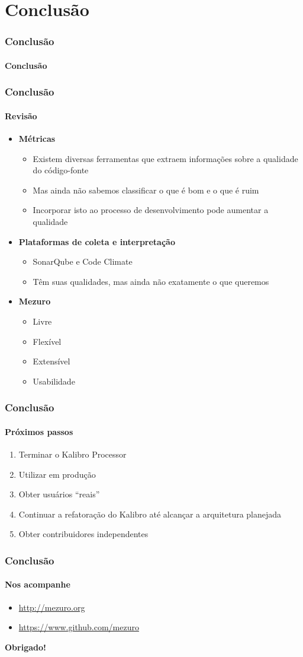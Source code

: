 \documentclass{beamer}
\begin{document}
\section{Conclusão}
\begin{frame}
  \frametitle{Conclusão}
  \framesubtitle{}

  \LARGE{\textbf{Conclusão}}
\end{frame}

\begin{frame}
  \frametitle{Conclusão}
  \framesubtitle{Revisão}

  \begin{itemize}
    \item \textbf{Métricas}
      \begin{itemize}
        \item Existem diversas ferramentas que extraem informações sobre a qualidade do código-fonte
        \item Mas ainda não sabemos classificar o que é bom e o que é ruim
        \item Incorporar isto ao processo de desenvolvimento pode aumentar a qualidade
      \end{itemize}
    \item \textbf{Plataformas de coleta e interpretação}
      \begin{itemize}
        \item SonarQube e Code Climate
        \item Têm suas qualidades, mas ainda não exatamente o que queremos
      \end{itemize}
    \item \textbf{Mezuro}
      \begin{itemize}
        \item Livre
        \item Flexível
        \item Extensível
        \item Usabilidade
      \end{itemize}
  \end{itemize}
\end{frame}

\begin{frame}
  \frametitle{Conclusão}
  \framesubtitle{Próximos passos}

  \begin{enumerate}
    \item Terminar o Kalibro Processor
    \item Utilizar em produção
    \item Obter usuários ``reais''
    \item Continuar a refatoração do Kalibro até alcançar a arquitetura planejada
    \item Obter contribuidores independentes
  \end{enumerate}
\end{frame}

\begin{frame}
  \frametitle{Conclusão}
  \framesubtitle{Nos acompanhe}

  \begin{itemize}
    \item \url{http://mezuro.org}
    \item \url{https://www.github.com/mezuro}
  \end{itemize}

  \LARGE{\textbf{Obrigado!}}
\end{frame}
\end{document}
